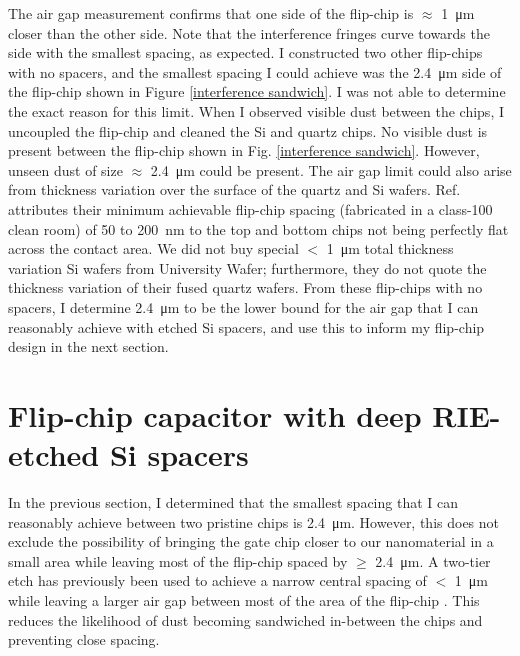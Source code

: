 \documentclass[double,12pt,1in]{beavtex}
\begin{document}
The air gap measurement confirms that one side of the flip-chip is $\approx$ \SI{1}{\micro\meter} closer than the other side. Note that the interference fringes curve towards the side with the smallest spacing, as expected. I constructed two other flip-chips with no spacers, and the smallest spacing I could achieve was the \SI{2.4}{\micro\meter} side of the flip-chip shown in Figure \ref{interference sandwich}. I was not able to determine the exact reason for this limit. When I observed visible dust between the chips, I uncoupled the flip-chip and cleaned the Si and quartz chips. No visible dust is present between the flip-chip shown in Fig. \ref{interference sandwich}. However, unseen dust of size $\approx$ \SI{2.4}{\micro\meter} could be present. The air gap limit could also arise from thickness variation over the surface of the quartz and Si wafers. Ref. \cite{bennaceur_mechanical_2015} attributes their minimum achievable flip-chip spacing (fabricated in a class-100 clean room) of 50 to \SI{200}{\nano\meter} to the top and bottom chips not being perfectly flat across the contact area. We did not buy special $<$ \SI{1}{\micro\meter} total thickness variation Si wafers from University Wafer; furthermore, they do not quote the thickness variation of their fused quartz wafers. From these flip-chips with no spacers, I determine \SI{2.4}{\micro\meter} to be the lower bound for the air gap that I can reasonably achieve with etched Si spacers, and use this to inform my flip-chip design in the next section.


\section{Flip-chip capacitor with deep RIE-etched Si spacers} \label{FC SIspacer}
In the previous section, I determined that the smallest spacing that I can reasonably achieve between two pristine chips is \SI{2.4}{\micro\meter}. However, this does not exclude the possibility of bringing the gate chip closer to our nanomaterial in a small area while leaving most of the flip-chip spaced by $\geq$ \SI{2.4}{\micro\meter}. A two-tier etch has previously been used to achieve a narrow central spacing of $<$ \SI{1}{\micro\meter} while leaving a larger air gap between most of the area of the flip-chip \cite{beukman_noninvasive_2015}. This reduces the likelihood of dust becoming sandwiched in-between the chips and preventing close spacing. 
\end{document}

